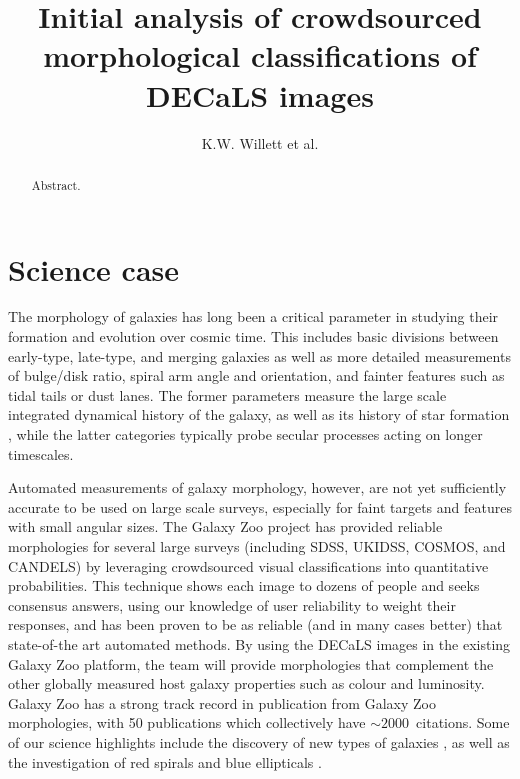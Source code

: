 \documentclass[iop,apj,tighten]{emulateapj}
\begin{document}
\title{Initial analysis of crowdsourced morphological classifications of DECaLS images}
\author{K.W. Willett et al.}

\begin{abstract}
Abstract.
\end{abstract}

\maketitle

\section{Science case}

The morphology of galaxies has long been a critical parameter in studying their formation and evolution over cosmic time. This includes basic divisions between early-type, late-type, and merging galaxies as well as more detailed measurements of bulge/disk ratio, spiral arm angle and orientation, and fainter features such as tidal tails or dust lanes. The former parameters measure the large scale integrated dynamical history of the galaxy, as well as its history of star formation \citep{sch14}, while the latter categories typically probe secular processes acting on longer timescales.

Automated measurements of galaxy morphology, however, are not yet sufficiently accurate to be used on large scale surveys, especially for faint targets and features with small angular sizes. The Galaxy Zoo project has provided reliable morphologies for several large surveys (including SDSS, UKIDSS, COSMOS, and CANDELS) by leveraging crowdsourced visual classifications into quantitative probabilities. This technique shows each image to dozens of people and seeks consensus answers, using our knowledge of user reliability to weight their responses, and has been proven \citep{lin11,wil13} to be as reliable (and in many cases better) that state-of-the art automated methods. By using the DECaLS images in the existing Galaxy Zoo platform, the team will provide morphologies that complement the other globally measured host galaxy properties such as colour and luminosity. Galaxy Zoo has a strong track record in publication from Galaxy Zoo morphologies, with 50 publications which collectively have $\sim2000$~citations. Some of our science highlights include the discovery of new types of galaxies \citep[e.g. green peas;][]{car09}, as well as the investigation of red spirals \citep{bam09,mas10a} and blue ellipticals \citep{sch09}.
\end{document}
